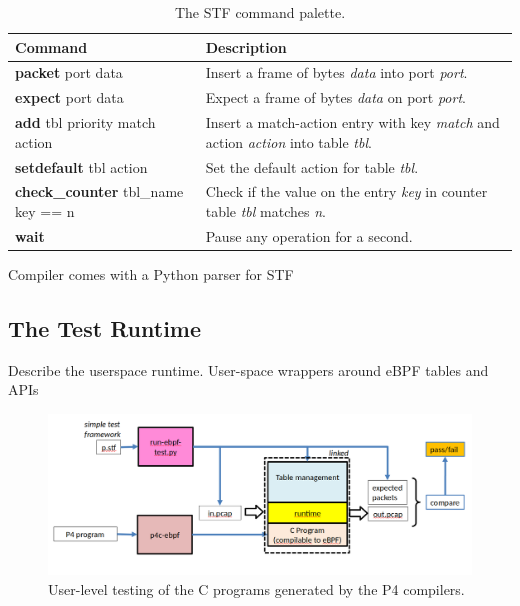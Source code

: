 \begin{table}[h]
	\begin{center}
		\begin{tabular}{|l|p{9cm}|} \hline
			\textbf{Command} & \textbf{Description} \\ \hline \hline
			\textbf{packet} port data & Insert a frame of bytes
			\textit{data} into port \textit{port}.    \\ \hline
			\textbf{expect} port data & Expect a frame of bytes
			\textit{data} on port \textit{port}.  \\ \hline
			\textbf{add} tbl priority match action & Insert a
			match-action entry with key \textit{match} and action
			\textit{action} into table \textit{tbl}. \\ \hline
			\textbf{setdefault} tbl action & Set the default action for table
			\textit{tbl}. \\
			\hline
			\textbf{check\_counter} tbl\_name key == n & Check if the value on
			the entry \textit{key} in counter table \textit{tbl} matches
			\textit{n}.  \\
			\hline
			\textbf{wait} & Pause any operation for a second. \\ \hline
		\end{tabular}
		\caption{The STF command palette.}\label{table:stf}
	\end{center}
\end{table}

Compiler comes with a Python parser for STF

\subsection{The Test Runtime}
Describe the userspace runtime.
User-space wrappers around eBPF tables and APIs
\begin{figure}
	\centering
	\includegraphics[width=\linewidth]{user_test}
	\caption{User-level testing of the C programs generated by the P4 compilers.}
	\label{fig:user_test}
\end{figure}


